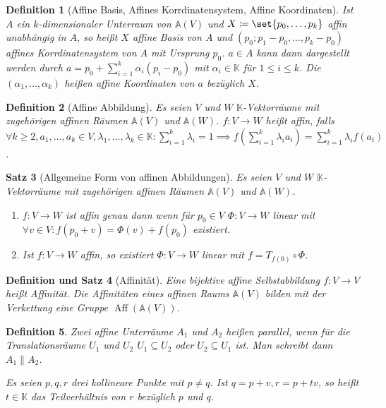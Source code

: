 \documentclass[a4paper]{article}
\newcounter{Sec}
\theoremstyle{marginbreak}
\newtheorem{definition}{Definition}[Sec]
\newtheorem{satz}[definition]{Satz}
\newtheorem{defsatz}[definition]{Definition und Satz}
\DeclareMathOperator{\Aff}{Aff}
\begin{document}
	\begin{definition}[Affine Basis, Affines Korrdinatensystem, Affine Koordinaten]
		Ist $A$ ein $k$-dimensionaler Unterraum von $\mathbb{A}(V)$ und $X\coloneqq\set{p_0,\ldots,p_k}$
		affin unabhängig in $A$, so heißt $X$ affine Basis von $A$ und $(p_0; p_1-p_0, \ldots, p_k - p_0)$
		affines Korrdinatensystem von $A$ mit Ursprung $p_0$. $a\in A$ kann dann dargestellt werden durch
		$a=p_0+\sum_{i=1}^k\alpha_i(p_i-p_0)$ mit $\alpha_i\in\mathbb{K}$ für $1\leq i\leq k$. Die
		$(\alpha_1,\ldots,\alpha_k)$ heißen affine Koordinaten von $a$ bezüglich $X$.
	\end{definition}
	\begin{definition}[Affine Abbildung]
		Es seien $V$ und $W$ $\mathbb{K}$-Vektorräume mit zugehörigen affinen Räumen
		$\mathbb{A}(V)$ und $\mathbb{A}(W)$. $f\colon V\to W$ heißt affin, falls
		$\forall k\geq 2, a_1,\ldots,a_k\in V, \lambda_1,\ldots, \lambda_k\in\mathbb{K}\colon \sum_{i=1}^k\lambda_i = 1
		\implies f(\sum_{i=1}^k\lambda_i a_i) = \sum_{i=1}^k\lambda_i f(a_i)$.
	\end{definition}
	\begin{satz}[Allgemeine Form von affinen Abbildungen]
		Es seien $V$ und $W$ $\mathbb{K}$-Vektorräume mit zugehörigen affinen Räumen
		$\mathbb{A}(V)$ und $\mathbb{A}(W)$.

		\begin{enumerate}[label=(\alph*)]
			\item $f\colon V\to W$ ist affin genau dann wenn für $p_0\in V$
				$\Phi\colon V\to W$ linear mit $\forall v\in V\colon f(p_0 + v) = \Phi(v) + f(p_0)$ existiert.
			\item Ist $f\colon V\to W$ affin, so existiert $\Phi\colon V\to W$ linear mit $f = T_{f(0)} \circ \Phi$.
		\end{enumerate}
	\end{satz}
	\begin{defsatz}[Affinität]
		Eine bijektive affine Selbstabbildung $f\colon V\to V$ heißt Affinität.
		Die Affinitäten eines affinen Raums $\mathbb{A}(V)$ bilden mit der Verkettung
		eine Gruppe $\Aff(\mathbb{A}(V))$.
	\end{defsatz}
	\begin{definition}
		Zwei affine Unterräume $A_1$ und $A_2$ heißen parallel, wenn für die
		Translationsräume $U_1$ und $U_2$ $U_1\subseteq U_2$ oder $U_2\subseteq U_1$ ist.
		Man schreibt dann $A_1\parallel A_2$.

		Es seien $p, q, r$ drei kollineare Punkte mit $p\neq q$. Ist $q = p + v, r = p+tv$, so
		heißt $t\in\mathbb{K}$ das Teilverhältnis von $r$ bezüglich $p$ und $q$.
	\end{definition}
\end{document}
